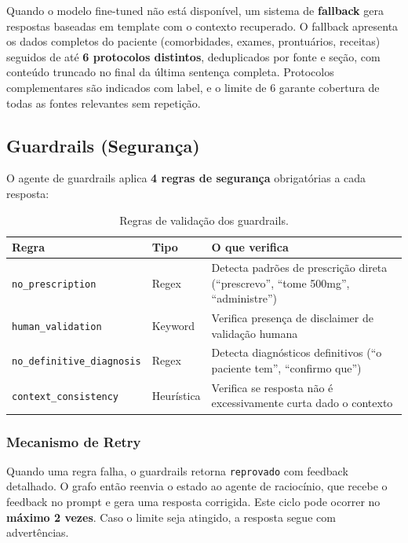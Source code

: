 Quando o modelo fine-tuned não está disponível, um sistema de \textbf{fallback} gera respostas baseadas em template com o contexto recuperado. O fallback apresenta os dados completos do paciente (comorbidades, exames, prontuários, receitas) seguidos de até \textbf{6 protocolos distintos}, deduplicados por fonte e seção, com conteúdo truncado no final da última sentença completa. Protocolos complementares são indicados com label, e o limite de 6 garante cobertura de todas as fontes relevantes sem repetição.

\subsection{Guardrails (Segurança)}

O agente de guardrails aplica \textbf{4 regras de segurança} obrigatórias a cada resposta:

\begin{table}[H]
\centering
\caption{Regras de validação dos guardrails.}
\label{tab:guardrails_rules}
\begin{tabularx}{\textwidth}{l l X}
\toprule
\textbf{Regra} & \textbf{Tipo} & \textbf{O que verifica} \\
\midrule
\texttt{no\_prescription} & Regex & Detecta padrões de prescrição direta (``prescrevo'', ``tome 500mg'', ``administre'') \\
\texttt{human\_validation} & Keyword & Verifica presença de disclaimer de validação humana \\
\texttt{no\_definitive\_diagnosis} & Regex & Detecta diagnósticos definitivos (``o paciente tem'', ``confirmo que'') \\
\texttt{context\_consistency} & Heurística & Verifica se resposta não é excessivamente curta dado o contexto \\
\bottomrule
\end{tabularx}
\end{table}

\subsubsection{Mecanismo de Retry}

Quando uma regra falha, o guardrails retorna \texttt{reprovado} com feedback detalhado. O grafo então reenvia o estado ao agente de raciocínio, que recebe o feedback no prompt e gera uma resposta corrigida. Este ciclo pode ocorrer no \textbf{máximo 2 vezes}. Caso o limite seja atingido, a resposta segue com advertências.


